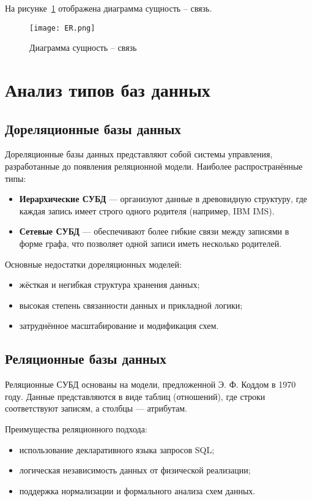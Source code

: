 На рисунке~\ref{fig:er} отображена диаграмма сущность -- связь.

\begin{figure}[H]
	\centering
	\texttt{[image: ER.png]}
	\caption{Диаграмма сущность -- связь}
	\label{fig:er}
\end{figure}


\section{Анализ типов баз данных}

\subsection{Дореляционные базы данных}

Дореляционные базы данных представляют собой системы управления, разработанные до появления реляционной модели. Наиболее распространённые типы:

\begin{itemize}
    \item \textbf{Иерархические СУБД} — организуют данные в древовидную структуру, где каждая запись имеет строго одного родителя (например, IBM IMS).
    \item \textbf{Сетевые СУБД} — обеспечивают более гибкие связи между записями в форме графа, что позволяет одной записи иметь несколько родителей.
\end{itemize}

Основные недостатки дореляционных моделей:
\begin{itemize}
    \item жёсткая и негибкая структура хранения данных;
    \item высокая степень связанности данных и прикладной логики;
    \item затруднённое масштабирование и модификация схем.
\end{itemize}

\subsection{Реляционные базы данных}

Реляционные СУБД основаны на модели, предложенной Э. Ф. Коддом в 1970 году. Данные представляются в виде таблиц (отношений), где строки соответствуют записям, а столбцы — атрибутам.

Преимущества реляционного подхода:
\begin{itemize}
    \item использование декларативного языка запросов SQL;
    \item логическая независимость данных от физической реализации;
    \item поддержка нормализации и формального анализа схем данных.
\end{itemize}

